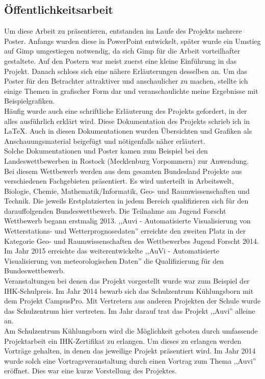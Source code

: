\subsection{Öffentlichkeitsarbeit} %
Um diese Arbeit zu präsentieren, entstanden im Laufe des Projekts mehrere Poster.
Anfangs wurden diese in PowerPoint entwickelt, später wurde ein Umstieg
auf Gimp umgestiegen notwendig,
da sich Gimp für die Arbeit vorteilhafter gestaltete.
Auf den Postern war meist zuerst eine kleine Einführung in das Projekt.
Danach schloss sich eine nähere Erläuterungen desselben an.
Um das Poster für den Betrachter attraktiver und anschaulicher zu machen,
stellte ich einige Themen in grafischer Form dar und
veranschaulichte meine Ergebnisse mit Beispielgrafiken. \\
Häufig wurde auch eine schriftliche Erläuterung des Projekts gefordert,
in der alles ausführlich erklärt wird.
Diese Dokumentation des Projekts schrieb ich in \LaTeX .
Auch in diesen Dokumentationen wurden Übersichten und Grafiken als Anschauungsmaterial
beigefügt und nötigenfalls näher erläutert.\\
Solche Dokumentationen und Poster kamen zum Beispiel bei
den Landeswettbewerben \jf in Rostock (Mecklenburg Vorpommern) zur Anwendung.
Bei diesem Wettbewerb werden aus dem gesamten
Bundesland Projekte aus verschiedenen Fachgebieten präsentiert.
Es wird unterteilt in Arbeitswelt, Biologie, Chemie,
Mathematik/Informatik, Geo- und Raumwissenschaften und Technik.
Die jeweils Erstplatzierten in jedem Bereich
qualifizieren sich für den darauffolgenden Bundeswettbewerb.
Die Teilnahme am Jugend Forscht Wettbewerb begann erstmalig 2013.
,,Auvi - Automatisierte Visualisierung von Wetterstations- und Wetterprognosedaten''
erreichte den zweiten Platz in der Kategorie Geo- und Raumwissenschaften des Wettbewerbes
Jugend Forscht 2014.
Im Jahr 2015 erreichte das weiterentwickelte
,,AuVi - Automatisierte Visualisierung von meteorologischen Daten''
die Qualifizierung für den Bundeswettbewerb.\\
Veranstaltungen bei denen das Projekt vorgestellt wurde war zum Beispiel der IHK-Schulpreis.
Im Jahr 2014 bewarb sich das Schulzentrum Kühlungsborn mit dem Projekt CampusPro.
Mit Vertretern aus anderen Projekten der Schule wurde das Schulzentrum hier vertreten.
Im Jahr darauf trat das Projekt ,,Auvi'' alleine an.\\
Am Schulzentrum Kühlungsborn wird die Möglichkeit geboten durch
umfassende Projektarbeit ein IHK-Zertifikat zu erlangen.
Um dieses zu erlangen werden Vorträge gehalten, in denen das jeweilige Projekt präsentiert wird.
Im Jahr 2014 wurde solch eine Vortragsveranstaltung durch einen Vortrag zum Thema ,,Auvi'' eröffnet.
Dies war eine kurze Vorstellung des Projektes.
